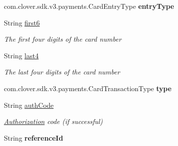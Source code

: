\begin{DoxyCompactItemize}
com.\+clover.\+sdk.\+v3.\+payments.\+Card\+Entry\+Type {\bfseries entry\+Type}
\item 
String \hyperlink{classcom_1_1clover_1_1sdk_1_1v3_1_1payments_1_1_card_transaction_a5f4d24bfe33a4978b075a5998604ecd1}{first6}
\begin{DoxyCompactList}\small\item\em The first four digits of the card number \end{DoxyCompactList}\item 
String \hyperlink{classcom_1_1clover_1_1sdk_1_1v3_1_1payments_1_1_card_transaction_aa514d551dce628465819ae919a0b9d2e}{last4}
\begin{DoxyCompactList}\small\item\em The last four digits of the card number \end{DoxyCompactList}\item 
\mbox{\label{classcom_1_1clover_1_1sdk_1_1v3_1_1payments_1_1_card_transaction_a059422417554c2eabda3ada88cb9a092}} 
com.\+clover.\+sdk.\+v3.\+payments.\+Card\+Transaction\+Type {\bfseries type}
\item 
String \hyperlink{classcom_1_1clover_1_1sdk_1_1v3_1_1payments_1_1_card_transaction_a7f036a82b6ff6786391b5b36962454d3}{auth\+Code}
\begin{DoxyCompactList}\small\item\em \hyperlink{classcom_1_1clover_1_1sdk_1_1v3_1_1payments_1_1_authorization}{Authorization} code (if successful) \end{DoxyCompactList}\item 
\mbox{\label{classcom_1_1clover_1_1sdk_1_1v3_1_1payments_1_1_card_transaction_a03a40195e8a9ce4958b27ce982d2fb6f}} 
String {\bfseries reference\+Id}
\item 
\mbox{\label{classcom_1_1clover_1_1sdk_1_1v3_1_1payments_1_1_card_transaction_a984d5522aebac3094e38e64f86e9312c}} 

\end{DoxyCompactItemize}
